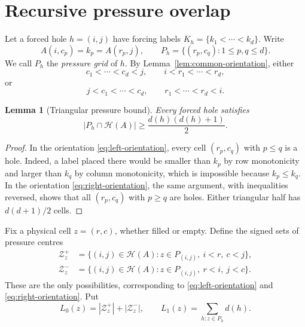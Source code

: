 \documentclass[11pt]{article}
\numberwithin{equation}{section}
\newtheorem{lemma}[theorem]{Lemma}
\theoremstyle{definition}
\theoremstyle{remark}
\newcommand{\Hcal}{\mathcal H}
\begin{document}
\section{Recursive pressure overlap}
\label{sec:pressure}

Let a forced hole $h=(i,j)$ have forcing labels
$K_h=\{k_1<\cdots<k_d\}$.  Write
\[
 A(i,c_p)=k_p=A(r_p,j),
 \qquad
 P_h=\{(r_p,c_q):1\le p,q\le d\}.
\]
We call $P_h$ the \emph{pressure grid} of $h$.  By
Lemma~\ref{lem:common-orientation}, either
\begin{equation}\label{eq:left-orientation}
 c_1<\cdots<c_d<j,\qquad i<r_1<\cdots<r_d,
\end{equation}
or
\begin{equation}\label{eq:right-orientation}
 j<c_1<\cdots<c_d,\qquad r_1<\cdots<r_d<i.
\end{equation}

\begin{lemma}[Triangular pressure bound]\label{lem:triangular-pressure}
Every forced hole satisfies
\begin{equation}\label{eq:triangular-pressure}
 |P_h\cap\Hcal(A)|\ge\frac{d(h)(d(h)+1)}2.
\end{equation}
\end{lemma}

\begin{proof}
In the orientation \eqref{eq:left-orientation}, every cell $(r_p,c_q)$ with
$p\le q$ is a hole.  Indeed, a label placed there would be smaller than $k_p$
by row monotonicity and larger than $k_q$ by column monotonicity, which is
impossible because $k_p\le k_q$.  In the orientation
\eqref{eq:right-orientation}, the same argument, with inequalities reversed,
shows that all $(r_p,c_q)$ with $p\ge q$ are holes.  Either triangular half
has $d(d+1)/2$ cells.
\end{proof}

Fix a physical cell $z=(r,c)$, whether filled or empty.  Define the signed
sets of pressure centres
\begin{align}
 \mathcal Z_z^+&=\{(i,j)\in\Hcal(A):z\in P_{(i,j)},\ i<r,\ c<j\},\label{eq:Zplus}\\
 \mathcal Z_z^-&=\{(i,j)\in\Hcal(A):z\in P_{(i,j)},\ r<i,\ j<c\}.
 \label{eq:Zminus}
\end{align}
These are the only possibilities, corresponding to
\eqref{eq:left-orientation} and \eqref{eq:right-orientation}.  Put
\begin{equation}\label{eq:def-loads}
 L_0(z)=|\mathcal Z_z^+|+|\mathcal Z_z^-|,
 \qquad
 L_1(z)=\sum_{h:z\in P_h}d(h).
\end{equation}
\end{document}
